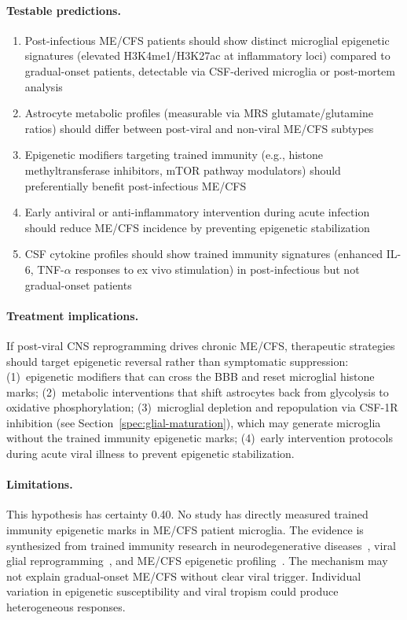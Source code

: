 \begin{speculation}
\paragraph{Testable predictions.}
\begin{enumerate}
    \item Post-infectious ME/CFS patients should show distinct microglial epigenetic signatures (elevated H3K4me1/H3K27ac at inflammatory loci) compared to gradual-onset patients, detectable via CSF-derived microglia or post-mortem analysis
    \item Astrocyte metabolic profiles (measurable via MRS glutamate/glutamine ratios) should differ between post-viral and non-viral ME/CFS subtypes
    \item Epigenetic modifiers targeting trained immunity (e.g., histone methyltransferase inhibitors, mTOR pathway modulators) should preferentially benefit post-infectious ME/CFS
    \item Early antiviral or anti-inflammatory intervention during acute infection should reduce ME/CFS incidence by preventing epigenetic stabilization
    \item CSF cytokine profiles should show trained immunity signatures (enhanced IL-6, TNF-$\alpha$ responses to ex vivo stimulation) in post-infectious but not gradual-onset patients
\end{enumerate}

\paragraph{Treatment implications.}
If post-viral CNS reprogramming drives chronic ME/CFS, therapeutic strategies should target epigenetic reversal rather than symptomatic suppression: (1)~epigenetic modifiers that can cross the BBB and reset microglial histone marks; (2)~metabolic interventions that shift astrocytes back from glycolysis to oxidative phosphorylation; (3)~microglial depletion and repopulation via CSF-1R inhibition (see Section~\ref{spec:glial-maturation}), which may generate microglia without the trained immunity epigenetic marks; (4)~early intervention protocols during acute viral illness to prevent epigenetic stabilization.

\paragraph{Limitations.}
This hypothesis has certainty 0.40. No study has directly measured trained immunity epigenetic marks in ME/CFS patient microglia. The evidence is synthesized from trained immunity research in neurodegenerative diseases~\cite{Wendeln2018InnateImmuneMemoryBrain,Zhang2025TrainedImmunityNeurological}, viral glial reprogramming~\cite{Rodrigues2025ViralReprogrammingGlialMetabolism}, and ME/CFS epigenetic profiling~\cite{Apostolou2024EpigeneticReprogrammingMECFS}. The mechanism may not explain gradual-onset ME/CFS without clear viral trigger. Individual variation in epigenetic susceptibility and viral tropism could produce heterogeneous responses.
\end{speculation}

